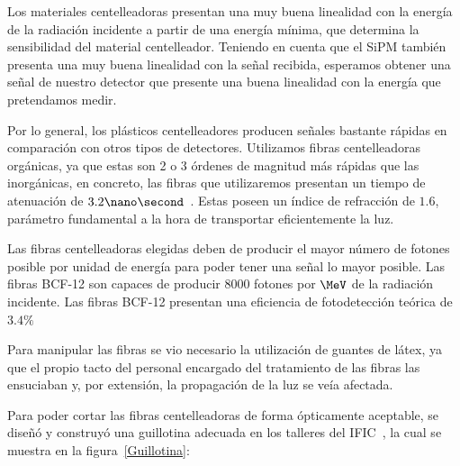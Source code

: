 Los materiales centelleadoras presentan una muy buena linealidad con la energía de la radiación incidente a partir de una energía mínima, que determina la sensibilidad del material centelleador. Teniendo en cuenta que el SiPM también presenta una muy buena linealidad con la señal recibida, esperamos obtener una señal de nuestro detector que presente una buena linealidad con la energía que pretendamos medir.

Por lo general, los plásticos centelleadores producen señales bastante rápidas en comparación con otros tipos de detectores. Utilizamos fibras centelleadoras orgánicas, ya que estas son 2 o 3 órdenes de magnitud más rápidas que las inorgánicas,  en concreto, las fibras que utilizaremos presentan un tiempo de atenuación de $3.2 \nano\second$~\cite{datasheet}. Estas poseen un índice de refracción de $1.6$, parámetro fundamental a la hora de transportar eficientemente la luz.

Las fibras centelleadoras elegidas deben de producir el mayor número de fotones  posible por unidad de energía para poder tener una señal lo mayor posible. Las fibras BCF-12 son capaces de producir $8000$ fotones por $\MeV$ de la radiación incidente. Las fibras BCF-12 presentan una eficiencia de fotodetección teórica de $3.4\%$~\cite{datasheet}

Para manipular las fibras se vio necesario la utilización de guantes de látex, ya que el propio tacto  del personal encargado del tratamiento de las fibras las ensuciaban y, por extensión, la propagación de la luz se veía afectada.

Para poder cortar las fibras centelleadoras de forma ópticamente aceptable, se diseñó y construyó una guillotina adecuada en los talleres del IFIC~\cite{Alberto,anguloytiempo, dependencias, tesisfibras}, la cual se muestra en la figura~\ref{Guillotina}:

